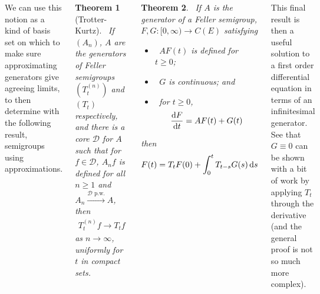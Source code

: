 \documentclass{tikzposter} %
\newcommand{\mc}{\mathcal}
\let\textd\d
\renewcommand{\d}{%
  \ifmmode
    \mathrm{d}%
  \else
    \textd%
  \fi
}
\newcommand\diff[2]{\ensuremath{\frac{\d #1}{\d #2}}}
\newcommand\rightopen[2]{\ensuremath{[#1,#2)}}
\newtheorem{theorem}{Theorem}
\begin{document}
\begin{columns}
{{      We can use this notion as a kind of basis set on which to make sure approximating generators give agreeing limits, to then determine with the following result, semigroups using approximations. \\

      \begin{theorem}[Trotter-Kurtz]
     \ If $(A_n)$, $A$ are the generators of Feller semigroups $(T_t^{(n)})$ and $(T_t)$ respectively, and there is a core $\mc{D}$ for $A$ such that for $f \in \mc{D}$, $A_nf$ is defined for all $n \ge 1$ and $A_n \overset{\mc{D} \!\text{ p.w.}}{\to} A$, then
     \begin{align*}
       T^{(n)}_tf \to T_t f
     \end{align*}
     as $n \to \infty$, uniformly for $t$ in compact sets.
      \end{theorem}
      \hphantom{}

      \begin{theorem}
    \ If $A$ is the generator of a Feller semigroup, $F, G : \rightopen{0}{\infty} \to C(E)$ satisfying
    \begin{itemize}[label=$\cdot$]
            \item \ $AF(t)$ is defined for $t \ge 0$;
            \item \ $G$ is continuous; and
            \item \ for $t \ge 0$, \begin{align*}
              \diff{F}{t} = AF(t) + G(t)
            \end{align*}
    \end{itemize}
    then
    \begin{align*}
      F(t) = T_t F(0) + \int_0^t T_{t-s} G(s) \,\d s
    \end{align*}
      \end{theorem}

      This final result is then a useful solution to a first order differential equation in terms of an infinitesimal generator. See that $G \equiv 0$ can be shown with a bit of work by applying $T_t$ through the derivative (and the general proof is not so much more complex). \\

}}
\end{columns}
\end{document}
